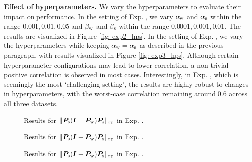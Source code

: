 \textbf{Effect of hyperparameters.} We vary the hyperparameters to evaluate their impact on performance. In the setting of Exp. , we vary $\alpha_{\text{w}}$ and $\alpha_{\text{s}}$ within the range ${0.001, 0.01, 0.05}$ and $\beta_{\text{w}}$ and $\beta_{\text{s}}$ within the range ${0.0001, 0.001, 0.01}$. The results are visualized in Figure \ref{fig: exp2_hps}. In the setting of Exp. , we vary the hyperparameters while keeping $\alpha_{\text{w}} = \alpha_{\text{s}}$ as described in the previous paragraph, with results visualized in Figure \ref{fig: exp3_hps}. Although certain hyperparameter configurations may lead to lower correlation, a non-trivial positive correlation is observed in most cases. Interestingly, in Exp. , which is seemingly the most `challenging setting', the results are highly robust to changes in hyperparameters, with the worst-case correlation remaining around 0.6 across all three datasets.



\begin{figure}[!t]
    \centering
{}
\hspace{.2cm}
\hspace{.2cm}
    \caption{ Results for $\lVert  {\bm{P}}_{\text{s}}({\bm{I}}-{\bm{P}}_{\text{w}}){\bm{P}}_{\text{s}}  \rVert_{\mathrm{op}}$ in Exp. . }
    \label{fig: molecular_PPP}
\end{figure}

\begin{figure}[!t]
    \centering
{}
    \caption{Results for $\lVert  {\bm{P}}_{\text{s}}({\bm{I}}-{\bm{P}}_{\text{w}}){\bm{P}}_{\text{s}}  \rVert_{\mathrm{op}}$ in Exp. . }
    \label{fig: embedding_PPP}
\end{figure}

\begin{figure}[!t]
    \centering
{}
    \caption{Results for $\lVert  {\bm{P}}_{\text{s}}({\bm{I}}-{\bm{P}}_{\text{w}}){\bm{P}}_{\text{s}}  \rVert_{\mathrm{op}}$ in Exp. . }
    \label{fig: end2end_PPP}
\end{figure}



